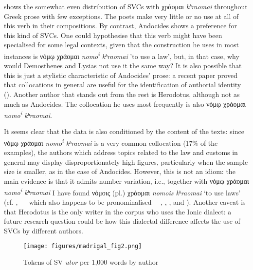 \documentclass[output=paper,colorlinks,citecolor=brown]{langscibook}
\begin{document}
 shows the somewhat even distribution of SVCs with χράομαι
\emph{kʰrao\-mai} throughout Greek prose with few exceptions. The poets
make very little or no use at all of this verb in their compositions. By contrast,
Andocides shows a preference for this kind of SVCs. One could hypothesise that this verb
might have been specialised for some legal contexts, given that the construction he uses
in most instances is νόμῳ χράομαι \emph{nomo\textsuperscript{i}
  kʰraomai} 'to use a law', but, in that case, why would Demosthenes and Lysias not use
it the same way? It is also possible that this is just a stylistic characteristic of
Andocides' prose: a recent paper proved that collocations in general are useful for the
identification of authorial identity (\cite{lopez_martin_use_2022}). Another author that
stands out from the rest is Herodotus, although not as much as Andocides. The collocation
he uses most frequently is also νόμῳ χράομαι \emph{nomo\textsuperscript{i}
  kʰraomai}.
  
  
  It seems clear that the data is also conditioned by the
content of the texts: since νόμῳ χράομαι \emph{nomo\textsuperscript{i}
  kʰraomai} is a very common collocation (17\% of the examples), the
authors which address topics related to the law and customs in general may display
disproportionately high figures, particularly when the sample size is smaller, as in the case of
Andocides. However, this is not an idiom: the main evidence is that it admits number
variation, i.e., together with νόμῳ χράομαι \emph{nomo\textsuperscript{i}
  kʰraomai} I have found νόμοις (pl.) χράομαι \emph{nomois
  kʰraomai} `to use laws' (cf. ,  --- which also happens to be pronominalised
---, , , and
). Another caveat is that Herodotus is the only
writer in the corpus who uses the Ionic dialect: a future research question could be how
this dialectal difference affects the use of SVCs by different authors.

\begin{figure}[htb]
  \centering
  \texttt{[image: figures/madrigal\_fig2.png]}
  \caption{Tokens of SV \emph{utor} per 1,000 words by author}
  \label{fig:ma:2}
\end{figure}
\end{document}
